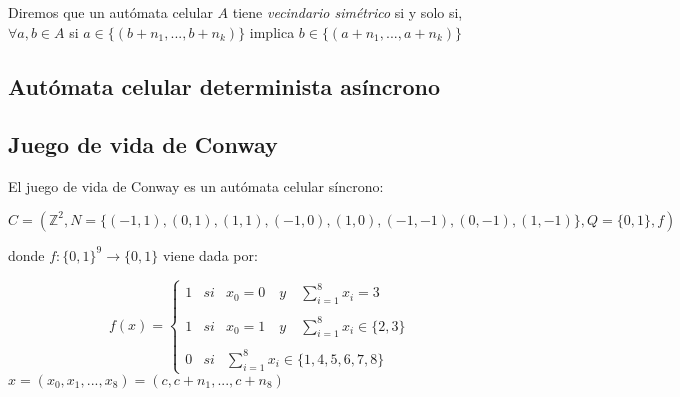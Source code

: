 \documentclass[../proyecto.tex]{memoir}
\begin{document}
Diremos que un autómata celular $A$ tiene \textit{vecindario simétrico} si y solo si, $ \forall a, b \in A $ si $ a \in \{ (b+n_{1},...,b+n_{k}) \} $ implica $ b \in \{ (a+n_{1},...,a+n_{k}) \} $

\subsection{Autómata celular determinista asíncrono}

\subsection{Juego de vida de Conway}

El juego de vida de Conway es un autómata celular síncrono:

\begin{equation}
C = (\mathds{Z}^{2} , N=\{(-1, 1), (0, 1), (1, 1), (-1, 0), (1, 0), (-1,-1), (0,-1), (1,-1) \}, Q=\{0,1\}, f)
\end{equation}
 
donde $f:\{0,1\}^{9} \rightarrow \{0,1\} $ viene dada por:

\begin{equation}
f(x)= \left\{ \begin{array}{lcc}
             1 &   si  & x_{0}=0 \quad y \quad \sum_{i=1}^{8} x_i = 3 \\
             \\ 1 & si & x_{0}=1 \quad y \quad \sum_{i=1}^{8} x_i \in \{2 ,3\} \\
             \\ 0 &  si  & \sum_{i=1}^{8} x_i \in \{1, 4, 5, 6, 7, 8\} \
             \end{array}
   \right. 
\end{equation}
$x = (x_{0}, x_{1}, ...,x_{8}) = (c,c+n_{1},...,c+n_{8})$
\end{document}
